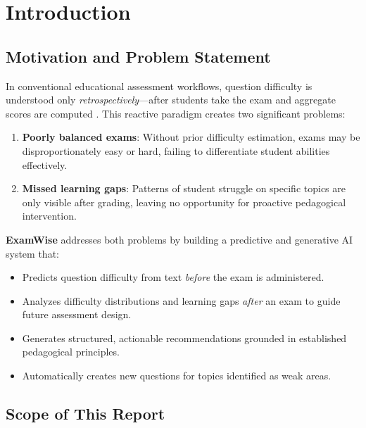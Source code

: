 \documentclass[12pt, a4paper]{article}
\begin{document}
\tableofcontents
\newpage

\section{Introduction}
\label{sec:intro}

\subsection{Motivation and Problem Statement}

In conventional educational assessment workflows, question difficulty is understood only \emph{retrospectively}---after students take the exam and aggregate scores are computed \citep{lord1980applications}. This reactive paradigm creates two significant problems:

\begin{enumerate}[noitemsep]
    \item \textbf{Poorly balanced exams}: Without prior difficulty estimation, exams may be disproportionately easy or hard, failing to differentiate student abilities effectively.
    \item \textbf{Missed learning gaps}: Patterns of student struggle on specific topics are only visible after grading, leaving no opportunity for proactive pedagogical intervention.
\end{enumerate}

\textbf{ExamWise} addresses both problems by building a predictive and generative AI system that:
\begin{itemize}[noitemsep]
    \item Predicts question difficulty from text \emph{before} the exam is administered.
    \item Analyzes difficulty distributions and learning gaps \emph{after} an exam to guide future assessment design.
    \item Generates structured, actionable recommendations grounded in established pedagogical principles.
    \item Automatically creates new questions for topics identified as weak areas.
\end{itemize}

\subsection{Scope of This Report}
\end{document}
